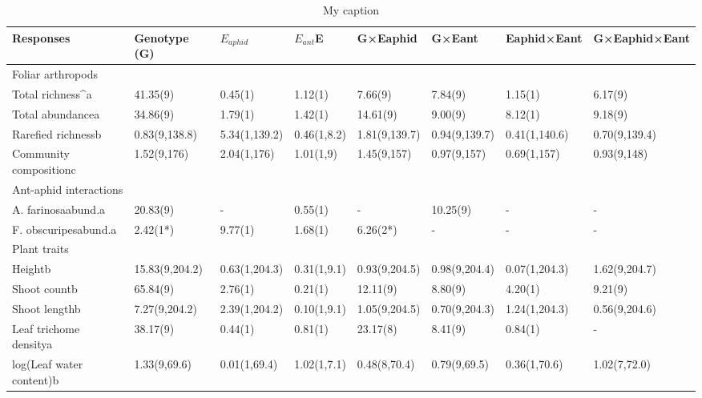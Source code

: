 \begin{table}[]
\centering
\caption{My caption}
\label{my-label}
\begin{tabular}{@{}llllllll@{}}
\toprule
Responses                & Genotype (G)   & \(E_{aphid}\)        &  \(E_{ant}\)E        & G×Eaphid      & G×Eant        & Eaphid×Eant   & G×Eaphid×Eant \\ \midrule
Foliar arthropods        &                &               &             &               &               &               &               \\
Total richness^a         & 41.35(9)       & 0.45(1)       & 1.12(1)     & 7.66(9)       & 7.84(9)       & 1.15(1)       & 6.17(9)       \\
Total abundancea         & 34.86(9)       & 1.79(1)       & 1.42(1)     & 14.61(9)      & 9.00(9)       & 8.12(1)       & 9.18(9)       \\
Rarefied richnessb       & 0.83(9,138.8)  & 5.34(1,139.2) & 0.46(1,8.2) & 1.81(9,139.7) & 0.94(9,139.7) & 0.41(1,140.6) & 0.70(9,139.4) \\
Community compositionc   & 1.52(9,176)    & 2.04(1,176)   & 1.01(1,9)   & 1.45(9,157)   & 0.97(9,157)   & 0.69(1,157)   & 0.93(9,148)   \\
Ant-aphid interactions   &                &               &             &               &               &               &               \\
A. farinosaabund.a       & 20.83(9)       & -             & 0.55(1)     & -             & 10.25(9)      & -             & -             \\
F. obscuripesabund.a     & 2.42(1*)       & 9.77(1)       & 1.68(1)     & 6.26(2*)      & -             & -             & -             \\
Plant traits             &                &               &             &               &               &               &               \\
Heightb                  & 15.83(9,204.2) & 0.63(1,204.3) & 0.31(1,9.1) & 0.93(9,204.5) & 0.98(9,204.4) & 0.07(1,204.3) & 1.62(9,204.7) \\
Shoot countb             & 65.84(9)       & 2.76(1)       & 0.21(1)     & 12.11(9)      & 8.80(9)       & 4.20(1)       & 9.21(9)       \\
Shoot lengthb            & 7.27(9,204.2)  & 2.39(1,204.2) & 0.10(1,9.1) & 1.05(9,204.5) & 0.70(9,204.3) & 1.24(1,204.3) & 0.56(9,204.6) \\
Leaf trichome densitya   & 38.17(9)       & 0.44(1)       & 0.81(1)     & 23.17(8)      & 8.41(9)       & 0.84(1)       & -             \\
log(Leaf water content)b & 1.33(9,69.6)   & 0.01(1,69.4)  & 1.02(1,7.1) & 0.48(8,70.4)  & 0.79(9,69.5)  & 0.36(1,70.6)  & 1.02(7,72.0)  \\ \bottomrule
\end{tabular}
\end{table}